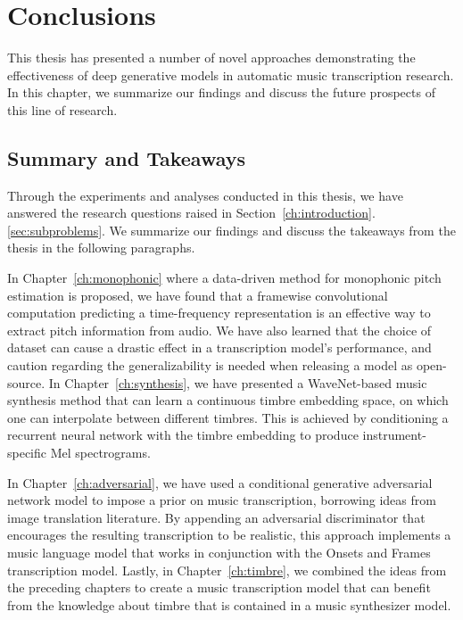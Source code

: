 
\graphicspath{{8-conclusions/figures/}}

\chapter{Conclusions}
\label{ch:conclusions}

This thesis has presented a number of novel approaches demonstrating the effectiveness of deep generative models in automatic music transcription research.
In this chapter, we summarize our findings and discuss the future prospects of this line of research.

\section{Summary and Takeaways}


Through the experiments and analyses conducted in this thesis, we have answered the research questions raised in Section~\ref{ch:introduction}.\ref{sec:subproblems}.
We summarize our findings and discuss the takeaways from the thesis in the following paragraphs.

In Chapter~\ref{ch:monophonic} where a data-driven method for monophonic pitch estimation is proposed, we have found that a framewise convolutional computation predicting a time-frequency representation is an effective way to extract pitch information from audio.
We have also learned that the choice of dataset can cause a drastic effect in a transcription model's performance, and caution regarding the generalizability is needed when releasing a model as open-source.
In Chapter~\ref{ch:synthesis}, we have presented a WaveNet-based music synthesis method that can learn a continuous timbre embedding space, on which one can interpolate between different timbres.
This is achieved by conditioning a recurrent neural network with the timbre embedding to produce instrument-specific Mel spectrograms.

In Chapter~\ref{ch:adversarial}, we have used a conditional generative adversarial network model to impose a prior on music transcription, borrowing ideas from image translation literature.
By appending an adversarial discriminator that encourages the resulting transcription to be realistic, this approach implements a music language model that works in conjunction with the Onsets and Frames transcription model.
Lastly, in Chapter~\ref{ch:timbre}, we combined the ideas from the preceding chapters to create a music transcription model that can benefit from the knowledge about timbre that is contained in a music synthesizer model.


